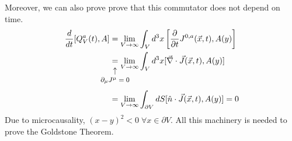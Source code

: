 \documentclass[../main.tex]{subfiles}
\begin{document}
Moreover, we can also prove prove that this commutator does not depend on time.
\begin{align*}
\frac{d}{dt}[Q_V^a(t),A]&=\lim_{V\to\infty}\int_Vd^3x\left[\frac{\partial}{\partial t}J^{0,a}(\Vec{x},t),A(y)\right]\\
&\underset{\mathclap{\tikz \node {$\uparrow$} node [below=1ex] {\footnotesize $\partial_\mu J^\mu=0$ };}}{=}\lim_{V\to\infty}\int_Vd^3x[\Vec{\nabla}\cdot\Vec{J}(\Vec{x},t),A(y)]\\
&=\lim_{V\to\infty}\int_{\partial V}dS[\hat{n}\cdot\Vec{J}(\Vec{x},t),A(y)]=0
\end{align*}
Due to microcausality, $(x-y)^2<0\;\forall x\in\partial V$.
All this machinery is needed to prove the Goldstone Theorem.
\end{document}
